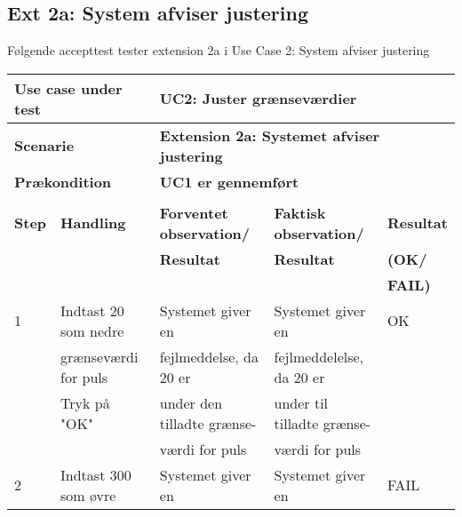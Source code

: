 \subsection{Ext 2a: System afviser justering}
\vspace{0.3 cm}
Følgende accepttest tester extension 2a i Use Case 2: System afviser justering
\clearpage

\begin{table}[h!]
	\begin{tabular}{lllll}
		\multicolumn{2}{l|}{\textbf{Use case under test}} & \multicolumn{3}{l}{\textbf{UC2: Juster grænseværdier}} \\ \hline
		\multicolumn{2}{l|}{\textbf{Scenarie}} & \multicolumn{3}{l}{\textbf{Extension 2a: Systemet afviser justering}} \\ \hline
		\multicolumn{2}{l|}{\textbf{Prækondition}} & \multicolumn{3}{l}{\textbf{UC1 er gennemført}} \\ \hline
		\multicolumn{5}{l}{\cellcolor[HTML]{187ABD}{\color[HTML]{187ABD} }} \\ \hline
		\multicolumn{1}{l|}{\textbf{Step}} & \multicolumn{1}{l|}{\textbf{Handling}} & \multicolumn{1}{l|}{\textbf{Forventet observation/}} & \multicolumn{1}{l|}{\textbf{Faktisk observation/}} & \textbf{Resultat} \\
		\multicolumn{1}{l|}{} & \multicolumn{1}{l|}{} & \multicolumn{1}{l|}{\textbf{Resultat}} & \multicolumn{1}{l|}{\textbf{Resultat}} & \textbf{(OK/} \\
		\multicolumn{1}{l|}{} & \multicolumn{1}{l|}{} & \multicolumn{1}{l|}{\textbf{}} & \multicolumn{1}{l|}{\textbf{}} & \textbf{FAIL)} \\ \hline
		\multicolumn{1}{l|}{1} & \multicolumn{1}{l|}{Indtast 20 som nedre} & \multicolumn{1}{l|}{Systemet giver en} & \multicolumn{1}{l|}{Systemet giver en} & OK \\
		\multicolumn{1}{l|}{} & \multicolumn{1}{l|}{grænseværdi for puls} & \multicolumn{1}{l|}{fejlmeddelse, da 20 er} & \multicolumn{1}{l|}{fejlmeddelelse, da 20 er} &  \\
		\multicolumn{1}{l|}{} & \multicolumn{1}{l|}{Tryk på "OK"} & \multicolumn{1}{l|}{under den tilladte grænse-} & \multicolumn{1}{l|}{under til tilladte grænse-} &  \\
		\multicolumn{1}{l|}{} & \multicolumn{1}{l|}{} & \multicolumn{1}{l|}{værdi for puls} & \multicolumn{1}{l|}{værdi for puls} &  \\ \hline
		\multicolumn{1}{l|}{2} & \multicolumn{1}{l|}{Indtast 300 som øvre} & \multicolumn{1}{l|}{Systemet giver en} & \multicolumn{1}{l|}{Systemet giver en} & FAIL \\

\end{tabular}
\end{table}

